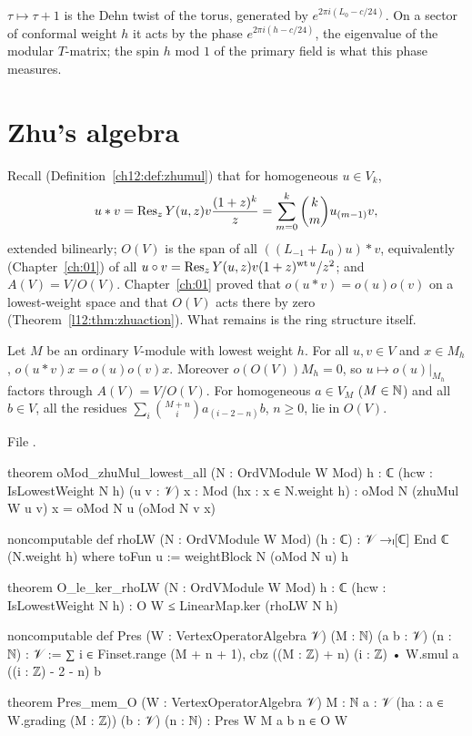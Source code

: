 \begin{physics}
$\tau\mapsto\tau+1$ is the Dehn twist of the torus, generated by $e^{2\pi i(L_0-c/24)}$. On a sector of
conformal weight $h$ it acts by the phase $e^{2\pi i(h-c/24)}$, the eigenvalue of the modular $T$-matrix; the
spin $h$ mod $1$ of the primary field is what this phase measures.
\end{physics}

\section{Zhu's algebra}\label{l12:sec:zhu}

Recall (Definition~\ref{ch12:def:zhumul}) that for homogeneous $u\in V_k$,
\begin{equation*}
 u*v = \operatorname{Res}_z Y(u,z)v\frac{(1+z)^k}{z} = \sum_{m=0}^k\binom km u_{(m-1)}v,
\end{equation*}
extended bilinearly; $O(V)$ is the span of all $((L_{-1}+L_0)u)*v$, equivalently (Chapter~\ref{ch:01}) of all
$u\circ v = \operatorname{Res}_zY(u,z)v(1+z)^{\operatorname{wt} u}/z^2$; and $A(V) = V/O(V)$. Chapter~\ref{ch:01} proved that
$o(u*v) = o(u)o(v)$ on a lowest-weight space and that $O(V)$ acts there by zero
(Theorem~\ref{l12:thm:zhuaction}). What remains is the ring structure itself.

\begin{theorem}\label{l12:thm:zhuaction}
Let $M$ be an ordinary $V$-module with lowest weight $h$. For all $u,v\in V$ and $x\in M_h$,
$o(u*v)x = o(u)o(v)x$. Moreover $o(O(V))M_h = 0$, so $u\mapsto o(u)|_{M_h}$ factors through $A(V) = V/O(V)$. For homogeneous
$a\in V_M$ ($M\in{\mathbb{N}}$) and all $b\in V$, all the residues $\sum_i\binom{M+n}{i}a_{(i-2-n)}b$, $n\ge0$, lie in $O(V)$.
\end{theorem}
\noindent File .
\begin{leancode}
theorem oMod_zhuMul_lowest_all (N : OrdVModule W Mod) {h : ℂ} (hcw : IsLowestWeight N h)
    (u v : 𝒱) {x : Mod} (hx : x ∈ N.weight h) :
    oMod N (zhuMul W u v) x = oMod N u (oMod N v x)

noncomputable def rhoLW (N : OrdVModule W Mod) (h : ℂ) : 𝒱 →ₗ[ℂ] End ℂ (N.weight h) where
  toFun u := weightBlock N (oMod N u) h

theorem O_le_ker_rhoLW (N : OrdVModule W Mod) {h : ℂ} (hcw : IsLowestWeight N h) :
    O W ≤ LinearMap.ker (rhoLW N h)

noncomputable def Pres (W : VertexOperatorAlgebra 𝒱) (M : ℕ) (a b : 𝒱) (n : ℕ) : 𝒱 :=
  ∑ i ∈ Finset.range (M + n + 1), cbz ((M : ℤ) + n) (i : ℤ) • W.smul a ((i : ℤ) - 2 - n) b

theorem Pres_mem_O (W : VertexOperatorAlgebra 𝒱) {M : ℕ} {a : 𝒱}
    (ha : a ∈ W.grading (M : ℤ)) (b : 𝒱) (n : ℕ) : Pres W M a b n ∈ O W
\end{leancode}

